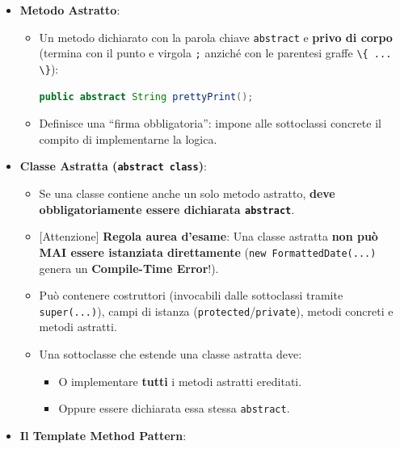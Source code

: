 \documentclass[11pt,a4paper,oneside]{report}
\newcommand{\passthrough}[1]{#1}
\providecommand{\tightlist}{\setlength{\itemsep}{0pt}\setlength{\parskip}{0pt}}
\begin{document}
\begin{itemize}
\tightlist
\item
  \textbf{Metodo Astratto}:

  \begin{itemize}
  \item
    Un metodo dichiarato con la parola chiave
    \passthrough{\lstinline!abstract!} e \textbf{privo di corpo}
    (termina con il punto e virgola \passthrough{\lstinline!;!} anziché
    con le parentesi graffe \passthrough{\lstinline!\{ ... \}!}):

\begin{lstlisting}[language=Java]
public abstract String prettyPrint();
\end{lstlisting}
  \item
    Definisce una ``firma obbligatoria'': impone alle sottoclassi
    concrete il compito di implementarne la logica.
  \end{itemize}
\item
  \textbf{Classe Astratta (\passthrough{\lstinline!abstract class!})}:

  \begin{itemize}
  \tightlist
  \item
    Se una classe contiene anche un solo metodo astratto, \textbf{deve
    obbligatoriamente essere dichiarata
    \passthrough{\lstinline!abstract!}}.
  \item
    {[}Attenzione{]} \textbf{Regola aurea d'esame}: Una classe astratta
    \textbf{non può MAI essere istanziata direttamente}
    (\passthrough{\lstinline!new FormattedDate(...)!} genera un
    \textbf{Compile-Time Error}!).
  \item
    Può contenere costruttori (invocabili dalle sottoclassi tramite
    \passthrough{\lstinline!super(...)!}), campi di istanza
    (\passthrough{\lstinline!protected!}/\passthrough{\lstinline!private!}),
    metodi concreti e metodi astratti.
  \item
    Una sottoclasse che estende una classe astratta deve:

    \begin{itemize}
    \tightlist
    \item
      O implementare \textbf{tutti} i metodi astratti ereditati.
    \item
      Oppure essere dichiarata essa stessa
      \passthrough{\lstinline!abstract!}.
    \end{itemize}
  \end{itemize}
\item
  \textbf{Il Template Method Pattern}:


\end{itemize}
\end{document}
